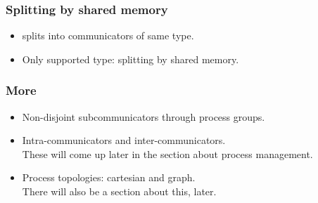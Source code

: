 \begin{frame}[containsverbatim]\frametitle{Splitting by shared memory}
  \begin{itemize}
  \item
     splits into communicators of same type.
  \item Only supported type:  splitting by
    shared memory.
  \end{itemize}

\end{frame}

\begin{frame}[containsverbatim]\frametitle{More}
  \begin{itemize}
  \item Non-disjoint subcommunicators through process groups.
  \item Intra-communicators and inter-communicators.\\
    These will come up later in the section about process management.
  \item Process topologies: cartesian and graph.\\
    There will also be a section about this, later.
  \end{itemize}
\end{frame}

\endinput

\begin{frame}[containsverbatim]\frametitle{}
\begin{lstlisting}
  
\end{lstlisting}
\end{frame}

